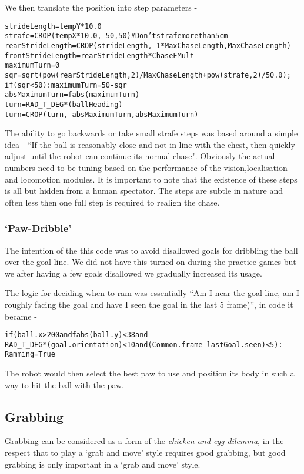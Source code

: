 We then translate the position into step parameters - 
\begin{alltt}
  strideLength = tempY*10.0
  strafe = CROP(tempX*10.0,-50,50)  # Don't strafe more than 5cm
  rearStrideLength = CROP(strideLength,-1*MaxChaseLength, MaxChaseLength)
  frontStrideLength = rearStrideLength*ChaseFMult
  maximumTurn = 0
  sqr = sqrt(pow(rearStrideLength,2)/MaxChaseLength + pow(strafe,2)/50.0);
  if (sqr < 50): maximumTurn = 50 - sqr
  absMaximumTurn = fabs(maximumTurn)
  turn = RAD_T_DEG*(ballHeading)
  turn = CROP(turn, -absMaximumTurn,absMaximumTurn)   
\end{alltt}

The ability to go backwards or take small strafe steps was based
around a simple idea - ``If the ball is reasonably close and not
in-line with the chest, then quickly adjust until the robot can
continue its normal chase". Obviously the actual numbers need to be
tuning based on the performance of the vision,localisation and
locomotion modules. It is important to note that the existence of these steps is all but
hidden from a human spectator. The steps are subtle in nature and
often less then one full step is required to realign the chase.

\subsubsection{`Paw-Dribble'}

The intention of the this code was to avoid disallowed goals for dribbling the ball over the goal line. We did not have this turned on during the practice games but we after having a few goals disallowed we gradually increased its usage.

The logic for deciding when to ram was essentially ``Am I near the goal line, am I roughly facing the goal and have I seen the goal in the last 5 frame)'', in code it became -
\begin{alltt}
if (ball.x > 200 and fabs(ball.y) < 38 and \\ RAD_T_DEG*(goal.orientation) < 10 and (Common.frame-lastGoal.seen) < 5):
    Ramming = True
\end{alltt}   
 
The robot would then select the best paw to use and position its body in such a way to hit the ball with the paw.

\subsection{Grabbing}
\label{bvr:grab}
Grabbing can be considered as a form of the \textit{chicken and
egg dilemma}, in the respect that to play a `grab and move' style
requires good grabbing, but good grabbing is only important in a
`grab and move' style.


